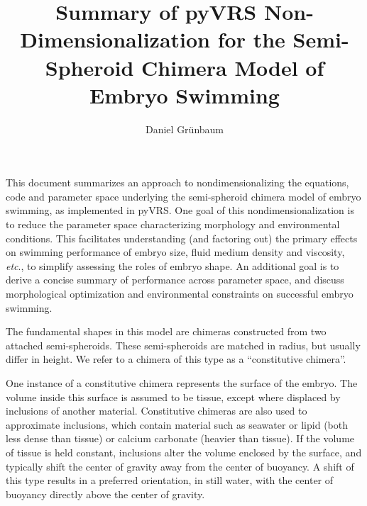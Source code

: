 \documentclass[10pt,a4paper]{article}
\title{Summary of pyVRS Non-Dimensionalization for the Semi-Spheroid Chimera Model of Embryo Swimming}
\author{Daniel Gr\"unbaum}
\def\etc{\emph{etc}.\xspace}
\begin{document}
\maketitle
This document summarizes an approach to nondimensionalizing the equations, code and parameter space underlying the semi-spheroid chimera model of embryo swimming, as implemented in pyVRS. 
One goal of this nondimensionalization is to reduce the parameter space characterizing morphology and environmental conditions. 
This facilitates understanding (and factoring out) the primary effects on swimming performance of embryo size, fluid medium density and viscosity, \etc, to simplify assessing the roles of embryo shape.
An additional goal is to derive a concise summary of performance across parameter space, and discuss morphological optimization and environmental constraints on successful embryo swimming.

The fundamental shapes in this model are chimeras constructed from two attached semi-spheroids. These semi-spheroids are matched in radius, but usually differ in height. 
We refer to a chimera of this type as a ``constitutive chimera''.

One instance of a constitutive chimera represents the surface of the embryo.
The volume inside this surface is assumed to be tissue, except where displaced by inclusions of another material. 
Constitutive chimeras are also used to approximate inclusions, which contain material such as seawater or lipid (both less dense than tissue) or calcium carbonate (heavier than tissue).
If the volume of tissue is held constant, inclusions alter the volume enclosed by the surface, and typically shift the center of gravity away from the center of buoyancy.
A shift of this type results in a preferred orientation, in still water, with the center of buoyancy directly above the center of gravity.
\end{document}

